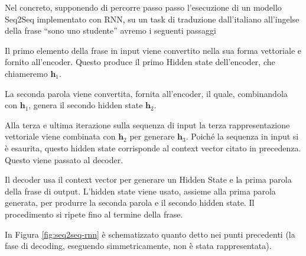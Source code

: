 \documentclass[12pt,a4paper,twoside,openright]{book}
\begin{document}
Nel concreto, supponendo di percorre passo passo l'esecuzione di un modello Seq2Seq implementato con RNN, su un task di traduzione dall'italiano all'ingelse della frase ``sono uno studente'' avremo i seguenti passaggi
\begin{enumerate}[label={[Iter \arabic*]}]
    \item Il primo elemento della frase in input viene convertito nella sua forma vettoriale e fornito all'encoder. Questo produce il primo Hidden state dell'encoder, che chiameremo $\mathbf{h}_1$.  
    \item La seconda parola viene convertita, fornita all'encoder, il quale, combinandola con $\mathbf{h}_1$, genera il secondo hidden state $\mathbf{h}_2$. 
    \item Alla terza e ultima iterazione sulla sequenza di input la terza rappresentazione vettoriale viene combinata con $\mathbf{h}_2$ per generare $\mathbf{h}_3$. Poiché la sequenza in input si è esaurita, questo hidden state corrisponde al context vector citato in precedenza. Questo viene passato al decoder.
    \item Il decoder usa il context vector per generare un Hidden State e la prima parola della frase di output. L'hidden state viene usato, assieme alla prima parola generata, per produrre la seconda parola e il secondo hidden state. Il procedimento si ripete fino al termine della frase.
\end{enumerate}

In Figura \ref{fig:seq2seq-rnn} è schematizzato quanto detto nei punti precedenti (la fase di decoding, eseguendo simmetricamente, non è stata rappresentata).
\end{document}
